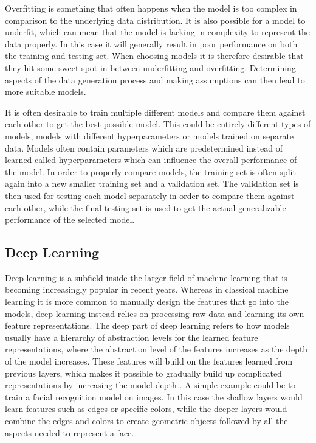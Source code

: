 Overfitting is something that often happens when the model is too complex in comparison to the underlying data distribution. It is also possible for a model to underfit, which can mean that the model is lacking in complexity to represent the data properly. In this case it will generally result in poor performance on both the training and testing set. When choosing models it is therefore desirable that they hit some sweet spot in between underfitting and overfitting. Determining aspects of the data generation process and making assumptions can then lead to more suitable models.

It is often desirable to train multiple different models and compare them against each other to get the best possible model. This could be entirely different types of models, models with different hyperparameters or models trained on separate data. Models often contain parameters which are predetermined instead of learned called hyperparameters which can influence the overall performance of the model. In order to properly compare models, the training set is often split again into a new smaller training set and a validation set. The validation set is then used for testing each model separately in order to compare them against each other, while the final testing set is used to get the actual generalizable performance of the selected model.

\subsection{Deep Learning}

Deep learning is a subfield inside the larger field of machine learning that is becoming increasingly popular in recent years. Whereas in classical machine learning it is more common to manually design the features that go into the models, deep learning instead relies on processing raw data and learning its own feature representations. The deep part of deep learning refers to how models usually have a hierarchy of abstraction levels for the learned feature representations, where the abstraction level of the features increases as the depth of the model increases. These features will build on the features learned from previous layers, which makes it possible to gradually build up complicated representations by increasing the model depth \cite{deeplearningbook}. A simple example could be to train a facial recognition model on images. In this case the shallow layers would learn features such as edges or specific colors, while the deeper layers would combine the edges and colors to create geometric objects followed by all the aspects needed to represent a face.

